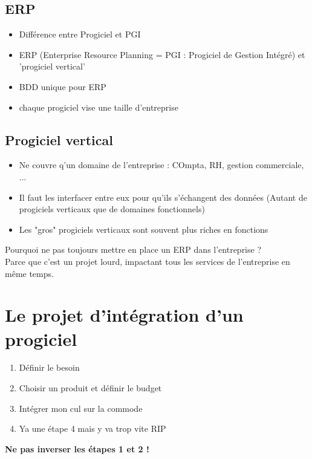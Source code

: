\documentclass[11pt,a4paper]{article}
\begin{document}
	\newpage

	\subsection{ERP}
	\begin{itemize}
		\item Différence entre Progiciel et PGI
		\item ERP (Enterprise Resource Planning = PGI : Progiciel de Gestion Intégré) et 'progiciel vertical'
		\item BDD unique pour ERP
		\item chaque progiciel vise une taille d'entreprise
	\end{itemize}

	\subsection{Progiciel vertical}
	\begin{itemize}
		\item Ne couvre q'un domaine de l'entreprise : COmpta, RH, gestion commerciale, ...
		\item Il faut les interfacer entre eux pour qu'ils s'échangent des données (Autant de progiciels verticaux que de domaines fonctionnels)
		\item Les "gros" progiciels verticaux sont souvent plus riches en fonctions
	\end{itemize}
	\vspace{2em}
	Pourquoi ne pas toujours mettre en place un ERP dans l'entreprise ?\\
	Parce que c'est un projet lourd, impactant tous les services de l'entreprise en même temps.
	
	\section{Le projet d'intégration d'un progiciel}
	
	\begin{enumerate}
		\item Définir le besoin
		\item Choisir un produit et définir le budget
		\item Intégrer mon cul sur la commode
		\item Ya une étape 4 mais y va trop vite RIP
	\end{enumerate}
	
	\textbf{Ne pas inverser les étapes 1 et 2 !}
	
\end{document}
